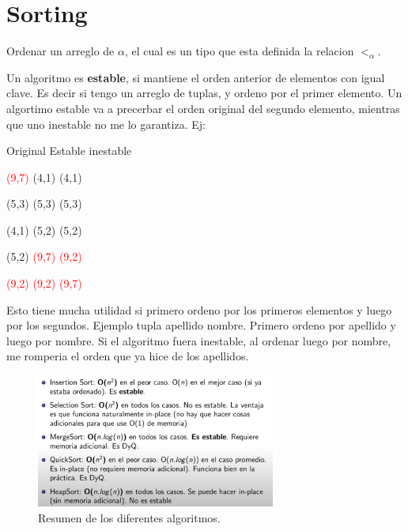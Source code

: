 \documentclass[11pt]{article}
\begin{document}
\section{Sorting}
Ordenar un arreglo de $\alpha$, el cual es un tipo
que esta definida la relacion $<_{\alpha}$.

Un algoritmo es \textbf{estable}, si mantiene el orden anterior de elementos
con igual clave.
Es decir si tengo un arreglo de tuplas, y ordeno por el primer  elemento.
Un algortimo estable va a precerbar el orden original del segundo elemento, mientras
que uno inestable no me lo garantiza.
Ej:

\begin{centering}
Original  \hspace{0.8cm} Estable \hspace{0.8cm} inestable

\textcolor{red}{(9,7)}  \hspace{1cm} (4,1) \hspace{1cm} (4,1)

(5,3) \hspace{1cm} (5,3)\hspace{1cm} (5,3)

(4,1) \hspace{1cm} (5,2)\hspace{1cm} (5,2)

(5,2) \hspace{1cm} \textcolor{red}{(9,7)} \hspace{1cm} \textcolor{red}{(9,2)}

\textcolor{red}{(9,2)} \hspace{1cm} \textcolor{red}{(9,2)} \hspace{1cm} \textcolor{red}{(9,7)}

Esto tiene mucha utilidad si primero ordeno por los primeros elementos y luego
por los segundos.
Ejemplo tupla apellido nombre. Primero ordeno por apellido y luego por
nombre.
Si el algoritmo fuera inestable, al ordenar luego por nombre, me
romperia el orden que ya hice de los apellidos.
\end{centering}

\begin{figure}[h!]
    \centering
    \includegraphics[width=0.7\textwidth]{sortResumen.png}
    \caption{Resumen de los diferentes algoritmos.}
    \label{fig:res}
\end{figure}
\end{document}
